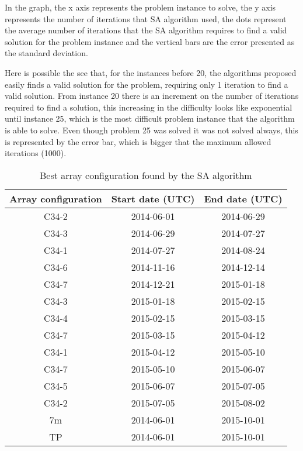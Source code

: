 In the graph, the x axis represents the problem instance to solve, the y axis represents the number of iterations that SA algorithm used, the dots represent the average number of iterations that the SA algorithm requires to find a valid solution for the problem instance and the vertical bars are the error presented as the standard deviation. 

Here is possible the see that, for the instances before 20, the algorithms proposed easily finds a valid solution for the problem, requiring only 1 iteration to find a valid solution. From instance 20 there is an increment on the number of iterations required to find a solution, this increasing in the difficulty looks like exponential until instance 25, which is the most difficult problem instance that the algorithm is able to solve. Even though problem 25 was solved it was not solved always, this is represented by the error bar, which is bigger that the maximum allowed iterations (1000).

\begin{table}[htbp]
\begin{center}
\begin{tabular}{|c|c|c|}
\hline
Array configuration & Start date (UTC) & End date (UTC) \\ \hline
C34-2 & 2014-06-01 & 2014-06-29  \\ \hline
C34-3 & 2014-06-29 & 2014-07-27 \\ \hline
C34-1 & 2014-07-27 & 2014-08-24 \\ \hline
C34-6 & 2014-11-16 & 2014-12-14 \\ \hline
C34-7 & 2014-12-21 & 2015-01-18 \\ \hline
C34-3 & 2015-01-18 & 2015-02-15 \\ \hline
C34-4 & 2015-02-15 & 2015-03-15 \\ \hline
C34-7 & 2015-03-15 & 2015-04-12 \\ \hline
C34-1 & 2015-04-12 & 2015-05-10 \\ \hline
C34-7 & 2015-05-10 & 2015-06-07 \\ \hline
C34-5 & 2015-06-07 & 2015-07-05  \\ \hline
C34-2 & 2015-07-05 & 2015-08-02  \\ \hline
7m & 2014-06-01 & 2015-10-01 \\ \hline
TP & 2014-06-01 & 2015-10-01 \\ \hline
\end{tabular}
\end{center}
\caption{Best array configuration found by the SA algorithm}
\label{table:best-arr-conf}
\end{table}

